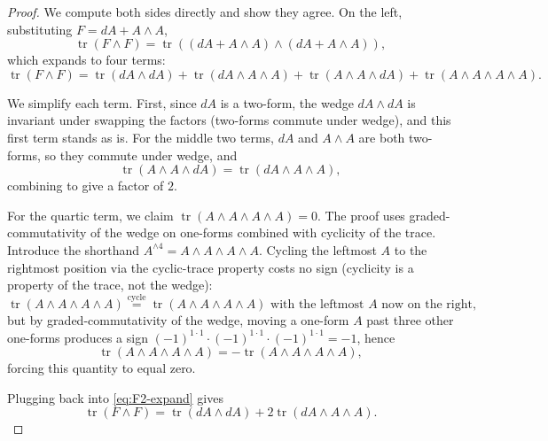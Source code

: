 \documentclass[11pt]{article}
\newcommand{\tr}{\operatorname{tr}}
\theoremstyle{definition}
\numberwithin{theorem}{section}
\numberwithin{equation}{section}
\begin{document}
\begin{proof}
We compute both sides directly and show they agree. On the left, substituting $F = dA + A\wedge A$,
\begin{equation*}
\tr(F\wedge F) = \tr\left((dA + A\wedge A)\wedge(dA + A\wedge A)\right),
\end{equation*}
which expands to four terms:
\begin{equation}\label{eq:F2-expand}
\tr(F\wedge F) = \tr(dA \wedge dA) + \tr(dA \wedge A\wedge A) + \tr(A\wedge A\wedge dA) + \tr(A\wedge A\wedge A\wedge A).
\end{equation}

\medskip

\noindent We simplify each term. First, since $dA$ is a two-form, the wedge $dA\wedge dA$ is invariant under swapping the factors (two-forms commute under wedge), and this first term stands as is. For the middle two terms, $dA$ and $A\wedge A$ are both two-forms, so they commute under wedge, and
\begin{equation*}
\tr(A\wedge A \wedge dA) = \tr(dA \wedge A\wedge A),
\end{equation*}
combining to give a factor of $2$.

\medskip

\noindent For the quartic term, we claim $\tr(A\wedge A\wedge A\wedge A) = 0$. The proof uses graded-commutativity of the wedge on one-forms combined with cyclicity of the trace. Introduce the shorthand $A^{\wedge 4} = A\wedge A\wedge A\wedge A$. Cycling the leftmost $A$ to the rightmost position via the cyclic-trace property costs no sign (cyclicity is a property of the trace, not the wedge):
\begin{equation*}
\tr(A\wedge A\wedge A\wedge A) \stackrel{\text{cycle}}{=} \tr(A\wedge A\wedge A\wedge A) \text{ with the leftmost $A$ now on the right,}
\end{equation*}
but by graded-commutativity of the wedge, moving a one-form $A$ past three other one-forms produces a sign $(-1)^{1\cdot 1}\cdot (-1)^{1\cdot 1}\cdot (-1)^{1\cdot 1} = -1$, hence
\begin{equation*}
\tr(A\wedge A\wedge A\wedge A) = -\tr(A\wedge A\wedge A\wedge A),
\end{equation*}
forcing this quantity to equal zero.

\medskip

\noindent Plugging back into \eqref{eq:F2-expand} gives
\begin{equation}\label{eq:F2-final}
\tr(F\wedge F) = \tr(dA \wedge dA) + 2\tr(dA\wedge A\wedge A).
\end{equation}


\end{proof}
\end{document}
